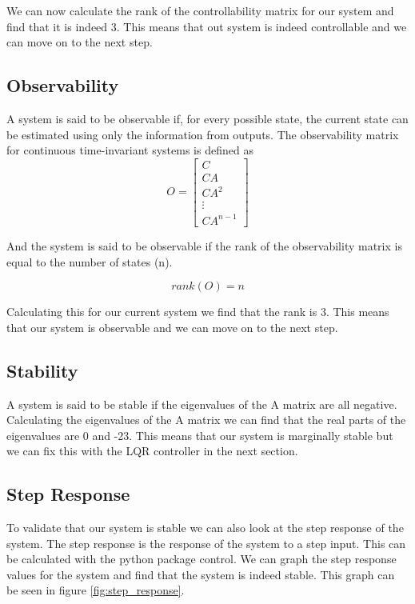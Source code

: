 \documentclass{scrartcl}
\begin{document}
We can now calculate the rank of the controllability matrix for our system and find that it is indeed 3. This means that out system is indeed controllable and we can move on to the next step.

\subsection{Observability}
A system is said to be observable if, for every possible state, the current state can be estimated using only the information from outputs.
The observability matrix for continuous time-invariant systems is defined as
\begin{equation}
    \mathit{O} = \begin{bmatrix}
        C      \\
        CA     \\
        CA^2   \\
        \vdots \\
        CA^{n-1}
    \end{bmatrix}
\end{equation}

And the system is said to be observable if the rank of the observability matrix is equal to the number of states (n).

\begin{equation}
    \mathit{rank}(\mathit{O}) = n
\end{equation}

Calculating this for our current system we find that the rank is 3. This means that our system is observable and we can move on to the next step.

\subsection{Stability}
A system is said to be stable if the eigenvalues of the A matrix are all negative.
Calculating the eigenvalues of the A matrix we can find that the real parts of the eigenvalues are 0 and -23. This means that our system is marginally stable but we can fix this with the LQR controller in the next section.

\subsection{Step Response}
To validate that our system is stable we can also look at the step response of the system.
The step response is the response of the system to a step input.
This can be calculated with the python package control.
We can graph the step response values for the system and find that the system is indeed stable. This graph can be seen in figure \ref{fig:step_response}.
\end{document}

